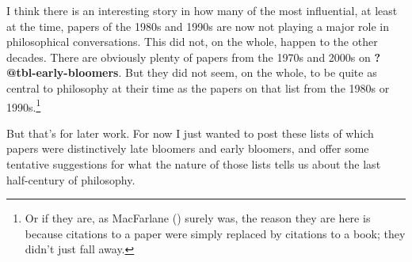 \documentclass[
  10pt,
  letterpaper,
  DIV=11,
  numbers=noendperiod,
  twoside]{scrartcl}
\begin{document}
I think there is an interesting story in how many of the most
influential, at least at the time, papers of the 1980s and 1990s are now
not playing a major role in philosophical conversations. This did not,
on the whole, happen to the other decades. There are obviously plenty of
papers from the 1970s and 2000s on \textbf{?@tbl-early-bloomers}. But
they did not seem, on the whole, to be quite as central to philosophy at
their time as the papers on that list from the 1980s or
1990s.\footnote{Or if they are, as MacFarlane
  () surely was, the reason they
  are here is because citations to a paper were simply replaced by
  citations to a book; they didn't just fall away.}

But that's for later work. For now I just wanted to post these lists of
which papers were distinctively late bloomers and early bloomers, and
offer some tentative suggestions for what the nature of those lists
tells us about the last half-century of philosophy.
\end{document}
